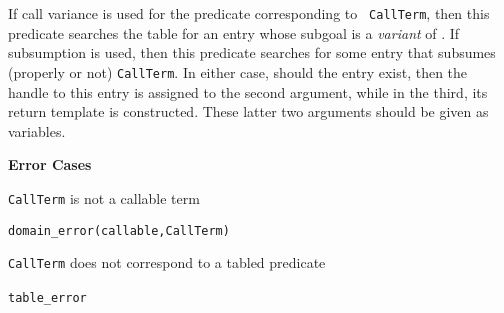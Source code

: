 \begin{description}


%
If call variance is used for the predicate corresponding to {\tt
  CallTerm}, then this predicate searches the table for an entry whose
subgoal is a \emph{variant} of .  If subsumption is
used, then this predicate searches for some entry that subsumes
(properly or not) {\tt CallTerm}.  In either case, should the entry
exist, then the handle to this entry is assigned to the second
argument, while in the third, its return template is constructed.
These latter two arguments should be given as variables.

{\bf Error Cases}
\bi
\item {\tt CallTerm} is not a callable term
\bi
\item {\tt domain\_error(callable,CallTerm)}
\ei
\item {\tt CallTerm} does not correspond to a tabled predicate
\bi
\item {\tt table\_error}
\ei
\ei
\ \\
\begin{minipage}{6in}
\end{minipage}
\end{description}
